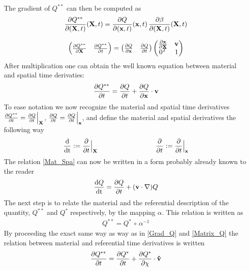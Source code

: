 The gradient of $Q^{**}$ can then be computed as
\begin{align}
\frac{\partial Q^{**}}{\partial (\mathbf{X},t)}(\mathbf{X},t) = \frac{\partial Q}{\partial (\mathbf{x},t)}(\mathbf{x},t) \, \frac{\partial \beta}{\partial (\mathbf{X},t)}(\mathbf{X},t)  \label{Grad_Q}
\end{align}

\begin{align}
	\begin{pmatrix} \frac{\partial Q^{**}}{\partial \mathbf{X}} & \frac{\partial Q^{**}}{\partial t}
	\end{pmatrix}
	= 
	\begin{pmatrix} \frac{\partial Q}{\partial \mathbf{x}} & \frac{\partial Q}{\partial t}
	\end{pmatrix}
	\begin{pmatrix} \frac{\partial \mathbf{x}}{\partial \mathbf{X}} & \mathbf{v} \\
											0^T & 1
	\end{pmatrix} \label{Matrix_Q}
\end{align}
After multiplication one can obtain the well known equation between material and spatial time derivaties:
\begin{align}
\frac{\partial Q^{**}}{\partial t} = \frac{\partial Q}{\partial t} + \frac{\partial Q}{\partial \mathbf{x}} \cdot \mathbf{v} \label{Mat_Spa}
\end{align}
To ease notation we now recognize the material and spatial time derivatives $\frac{\partial Q^{**}}{\partial t} = \frac{\partial Q}{\partial t}\Big{|}_{\mathbf{X}}$, $\frac{\partial Q}{\partial t} = \frac{\partial Q}{\partial t}\Big{|}_{\mathbf{x}}$, and define the material and spatial derivatives the following way
\begin{align}
\frac{\mathrm{d}}{\mathrm{dt}} := \pdi{}{t}\Big{|}_{\mathbf{X}} \hspace{3cm} \pdi{}{t} := \pdi{}{t}\Big{|}_{\mathbf{x}}
\end{align}
The relation \eqref{Mat_Spa} can now be written in a form probably already known to the reader
\begin{align}
\frac{\mathrm{d}Q}{\mathrm{dt}} = \frac{\partial Q}{\partial t} + (\mathbf{v} \cdot \nabla) Q \label{Material_derivative}
\end{align}
The next step is to relate the material and the referential description of the quantity, $Q^{**}$ and $Q^*$ respectively, by the mapping $\alpha$. This relation is written as 
\begin{align}
Q^{**} = Q^* \, \circ \, \alpha^{-1}
\end{align}
By proceeding the exact same way as way as in \eqref{Grad_Q} and \eqref{Matrix_Q} the relation between material and referential time derivatives is written
\begin{align}
\frac{\partial Q^{**}}{\partial t} = \frac{\partial Q^*}{\partial t} + \frac{\partial Q^*}{\partial \chi}\cdot \mathbf{\hat{v}}
\end{align}
